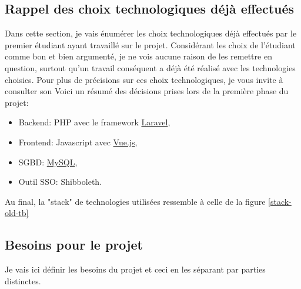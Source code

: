 \documentclass[
    iai, %
    il, %
]{heig-tb}
\begin{document}
\subsection{Rappel des choix technologiques déjà effectués}
Dans cette section, je vais énumérer les choix technologiques déjà effectués par le premier étudiant ayant travaillé sur le projet.
Considérant les choix de l'étudiant comme bon et bien argumenté, je ne vois aucune raison de les remettre en question, surtout qu'un travail conséquent a déjà été réalisé avec les technologies choisies. Pour plus de précisions sur ces choix technologiques, je vous invite à consulter son %
Voici un résumé des décisions prises lors de la première phase du projet:
\begin{itemize}
    \item Backend: PHP avec le framework \href{https://laravel.com/}{Laravel},
    \item Frontend: Javascript avec \href{https://vuejs.org/}{Vue.js},
    \item SGBD: \href{https://www.mysql.com/}{MySQL},
    \item Outil SSO: Shibboleth. %
\end{itemize}

Au final, la "stack" de technologies utilisées ressemble à celle de la figure \ref{stack-old-tb}



\subsection{Besoins pour le projet}
Je vais ici définir les besoins du projet et ceci en les séparant par parties distinctes.
\end{document}
